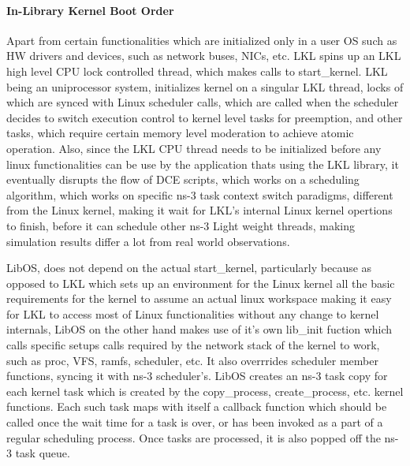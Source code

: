 \documentclass{sig-alternate}
\begin{document}
\paragraph{In-Library Kernel Boot Order}
Apart from certain functionalities which are initialized only in a user OS such as HW drivers and devices,
such as network buses, NICs, etc. LKL spins up an LKL high level CPU lock controlled thread, which makes calls to 
start\_kernel. LKL being an uniprocessor system, initializes kernel on a singular LKL thread, locks of 
which are synced with Linux scheduler calls, which are called when the scheduler decides to switch execution control 
to kernel level tasks for preemption, and other tasks, which require certain memory level moderation to achieve
atomic operation. Also, since the LKL CPU thread needs to be initialized before any linux  functionalities can be use by the 
application thats using the LKL library, it eventually disrupts the flow of DCE scripts, which works on a 
scheduling algorithm, which works on specific ns-3 task context switch paradigms, different from the Linux kernel,
making it wait for LKL's internal Linux kernel opertions to finish, before it can schedule other ns-3 Light weight
threads, making simulation results differ a lot from real world observations.

LibOS, does not depend on the actual start\_kernel, particularly because as opposed to LKL which sets up an environment 
for the Linux kernel all the basic requirements for the kernel to assume an actual linux workspace making it easy 
for LKL to access most of Linux functionalities without any change to kernel internals, LibOS on the other hand makes 
use of it's own lib\_init fuction which calls specific setups calls required by the network stack of the kernel to 
work, such as proc, VFS, ramfs, scheduler, etc. It also overrrides scheduler member functions, syncing it with ns-3 
scheduler's. LibOS creates an ns-3 task copy for each kernel task which is created by the copy\_process, create\_process,
etc. kernel functions. Each such task maps with itself a callback function which should be called once the wait time
for a task is over, or has been invoked as a part of a regular scheduling process. Once tasks are processed, it is
also popped off the ns-3 task queue.
\end{document}
